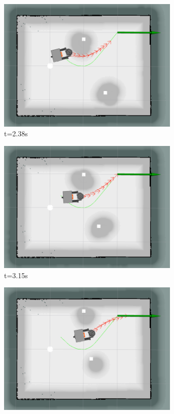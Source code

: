\begin{figure}[H]
\begin{subfigure}[b]{0.35\linewidth}
        \includegraphics[width=0.95\textwidth]{images/teb_single_2_obs/4/2738.png}
        \caption{t=2.38s}
    \end{subfigure}
    \begin{subfigure}[b]{0.35\linewidth}
        \centering
        \includegraphics[width=0.95\textwidth]{images/teb_single_2_obs/4/2815.png}
        \caption{t=3.15s}
    \end{subfigure}%
    \begin{subfigure}[b]{0.35\linewidth}
        \centering
        \includegraphics[width=0.95\textwidth]{images/teb_single_2_obs/4/2900.png}

\end{subfigure}
\end{figure}
